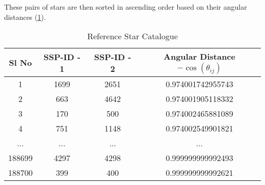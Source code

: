\documentclass[../../main.tex]{subfiles}
\begin{document}
These pairs of stars are then sorted in ascending order based on their angular distances (\ref{tab: reference_star_catalogue }).


\begin{table}[h!]
\centering
\begin{tabular}{cccc}
\rowcolor[HTML]{C0C0C0} 
\cellcolor[HTML]{C0C0C0}\textbf{Sl No} & \textbf{SSP-ID - 1} & \textbf{SSP-ID - 2} & \textbf{Angular Distance $- \cos(\theta_{ij})$} \\ \hline
1      & 1699 & 2651 & 0.974001742955743 \\
2      & 663  & 4642 & 0.974001905118332 \\
3      & 170  & 500  & 0.974002465881089 \\
4      & 751  & 1148 & 0.974002549901821 \\
...    & ...  & ...  & ...               \\
188699 & 4297 & 4298 & 0.999999999992493 \\
188700 & 399  & 400  & 0.999999999992621
\end{tabular}
\caption{Reference Star Catalogue}
\label{tab: reference_star_catalogue }
\end{table}
\newpage
\end{document}

